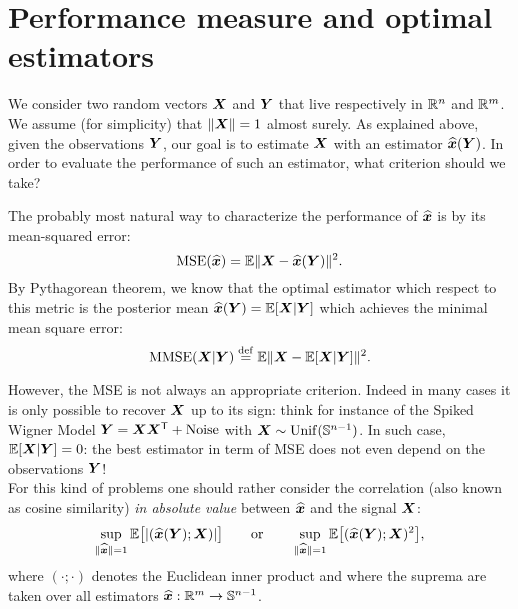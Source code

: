 \documentclass[12pt,nocut]{article}
\begin{document}
\section{Performance measure and optimal estimators}\label{sec:performance}

We consider two random vectors ${\boldsymbol X}$ and ${\boldsymbol Y}$ that live respectively in $\mathbb{R}^n$ and $\mathbb{R}^m$. 
We assume (for simplicity) that $\|{\boldsymbol X}\| = 1$ almost surely. 
As explained above, given the observations ${\boldsymbol Y}$, our goal is to estimate ${\boldsymbol X}$ with an estimator $\widehat{{\boldsymbol x}}({\boldsymbol Y})$. 
In order to evaluate the performance of such an estimator, what criterion should we take?

The probably most natural way to characterize the performance of $\widehat{{\boldsymbol x}}$ is by its mean-squared error:
$$
{{\rm MSE}}(\widehat{{\boldsymbol x}}) = \mathbb{E} \| {\boldsymbol X} - \widehat{{\boldsymbol x}}({\boldsymbol Y}) \|^2.
$$
By Pythagorean theorem, we know that the optimal estimator which respect to this metric is the posterior mean $\widehat{{\boldsymbol x}}({\boldsymbol Y}) = \mathbb{E}[{\boldsymbol X}| {\boldsymbol Y}]$ which achieves the minimal mean square error:
\begin{equation}\label{eq:def_mmse0}
	{{\rm MMSE}}({\boldsymbol X}|{\boldsymbol Y}) \overset{{\rm def}}{=} \mathbb{E} \| {\boldsymbol X} - \mathbb{E}[{\boldsymbol X}|{\boldsymbol Y}] \|^2.
\end{equation}

However, the MSE is not always an appropriate criterion. Indeed in many cases it is only possible to recover ${\boldsymbol X}$ up to its sign: think for instance of the Spiked Wigner Model ${\boldsymbol Y} = {\boldsymbol X}{\boldsymbol X}^{{\sf T}} + {\rm Noise}$ with ${\boldsymbol X} \sim {\rm Unif}(\mathbb{S}^{n-1})$. In such case, $\mathbb{E}[{\boldsymbol X}|{\boldsymbol Y}] = 0$: the best estimator in term of MSE does not even depend on the observations ${\boldsymbol Y}$!
\\

For this kind of problems one should rather consider the correlation (also known as cosine similarity) \textit{in absolute value} between $\widehat{{\boldsymbol x}}$ and the signal ${\boldsymbol X}$:
\begin{equation}\label{eq:correlation_metric}
\sup_{\|\widehat{{\boldsymbol x}}\| = 1} \mathbb{E}\big[|(\widehat{{\boldsymbol x}}({\boldsymbol Y}); {\boldsymbol X})|\big]
\qquad \text{or} \qquad
\sup_{\|\widehat{{\boldsymbol x}}\| = 1} \mathbb{E}\big[(\widehat{{\boldsymbol x}}({\boldsymbol Y}); {\boldsymbol X})^2\big],
\end{equation}
where $(\cdot; \cdot)$ denotes the Euclidean inner product and where the suprema are taken over all estimators $\widehat{{\boldsymbol x}}: \mathbb{R}^m \to \mathbb{S}^{n-1}$.
\\
\end{document}

